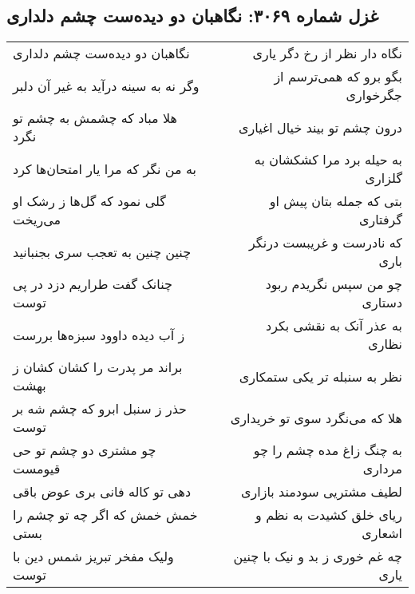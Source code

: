 \begin{center}
\section*{غزل شماره ۳۰۶۹: نگاهبان دو دیده‌ست چشم دلداری}
\label{sec:3069}
\begin{longtable}{l p{0.5cm} r}
نگاهبان دو دیده‌ست چشم دلداری
&&
نگاه دار نظر از رخ دگر یاری
\\
وگر نه به سینه درآید به غیر آن دلبر
&&
بگو برو که همی‌ترسم از جگرخواری
\\
هلا مباد که چشمش به چشم تو نگرد
&&
درون چشم تو بیند خیال اغیاری
\\
به من نگر که مرا یار امتحان‌ها کرد
&&
به حیله برد مرا کشکشان به گلزاری
\\
گلی نمود که گل‌ها ز رشک او می‌ریخت
&&
بتی که جمله بتان پیش او گرفتاری
\\
چنین چنین به تعجب سری بجنبانید
&&
که نادرست و غریبست درنگر باری
\\
چنانک گفت طراریم دزد در پی توست
&&
چو من سپس نگریدم ربود دستاری
\\
ز آب دیده داوود سبزه‌ها بررست
&&
به عذر آنک به نقشی بکرد نظاری
\\
براند مر پدرت را کشان کشان ز بهشت
&&
نظر به سنبله تر یکی ستمکاری
\\
حذر ز سنبل ابرو که چشم شه بر توست
&&
هلا که می‌نگرد سوی تو خریداری
\\
چو مشتری دو چشم تو حی قیومست
&&
به چنگ زاغ مده چشم را چو مرداری
\\
دهی تو کاله فانی بری عوض باقی
&&
لطیف مشتریی سودمند بازاری
\\
خمش خمش که اگر چه تو چشم را بستی
&&
ریای خلق کشیدت به نظم و اشعاری
\\
ولیک مفخر تبریز شمس دین با توست
&&
چه غم خوری ز بد و نیک با چنین یاری
\\
\end{longtable}
\end{center}
